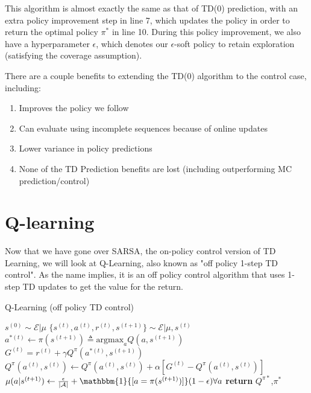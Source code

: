 \documentclass[11pt]{article}
\def\ind{\mathbbm{1}}
\begin{document}
This algorithm is almost exactly the same as that of TD(0) prediction, with an extra policy improvement step in line 7, which updates the policy in order to return the optimal policy $\pi^*$ in line 10. During this policy improvement, we also have a hyperparameter $\epsilon$, which denotes our $\epsilon$-soft policy to retain exploration (satisfying the coverage assumption).

There are a couple benefits to extending the TD(0) algorithm to the control case, including:
\begin{enumerate}
    \item Improves the policy we follow
    \item Can evaluate using incomplete sequences because of online updates
    \item Lower variance in policy predictions
    \item None of the TD Prediction benefits are lost (including outperforming MC prediction/control)
\end{enumerate}


\section{Q-learning}

Now that we have gone over SARSA, the on-policy control version of TD Learning, we will look at Q-Learning, also known as "off policy 1-step TD control". As the name implies, it is an off policy control algorithm that uses 1-step TD updates to get the value for the return.

\begin{algorithm}[H]
\caption{Q-Learning (off policy TD control)}
\label{algo:Q}
\begin{algorithmic}[1]
\STATE $s^{(0)} \sim \mathcal{E}|\mu$ \hfill
{}
\STATE $\{s^{(t)},a^{(t)},r^{(t)},s^{(t+1)}\} \sim \mathcal{E}|\mu, s^{(t)}$ \hfill
\STATE $a^{*(t)} \leftarrow \pi(s^{(t+1)}) \triangleq \text{argmax}_a Q(a,s^{(t+1)})$ \hfill
\STATE $G^{(t)} = r^{(t)} + \gamma Q^{\pi}(a^{*(t)},s^{(t+1)})$ 
\STATE $Q^{\pi}(a^{(t)},s^{(t)}) \leftarrow Q^{\pi}(a^{(t)},s^{(t)}) + \alpha[G^{(t)} - Q^{\pi}(a^{(t)},s^{(t)})]$ \hfill
\STATE $\mu(a|s^{(t+1)}) \leftarrow \frac{\epsilon}{|\mathcal{A}|} + \ind{[a = \pi(s^{(t+1)})]} (1 - \epsilon) \forall{a}$  \hfill
\ENDFOR
\ENDFOR
\STATE \textbf{return} $Q^{\pi*}$,$\pi^*$ \hfill
\end{algorithmic}
\end{algorithm}
\end{document}
